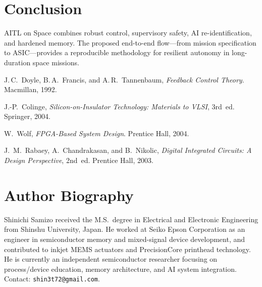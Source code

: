 \documentclass[conference]{IEEEtran}
\begin{document}
\section{Conclusion}
AITL on Space combines robust control, supervisory safety, AI re-identification, and hardened memory. The proposed end-to-end flow—from mission specification to ASIC—provides a reproducible methodology for resilient autonomy in long-duration space missions.

\begin{thebibliography}{99}
J.\,C.~Doyle, B.\,A.~Francis, and A.\,R.~Tannenbaum,
\emph{Feedback Control Theory}. Macmillan, 1992.

J.-P.~Colinge, \emph{Silicon-on-Insulator Technology: Materials to VLSI}, 3rd~ed. Springer, 2004.

W.~Wolf, \emph{FPGA-Based System Design}. Prentice Hall, 2004.

J.~M.~Rabaey, A.~Chandrakasan, and B.~Nikolic,
\emph{Digital Integrated Circuits: A Design Perspective}, 2nd~ed. Prentice Hall, 2003.
\end{thebibliography}

\section*{Author Biography}
Shinichi Samizo received the M.S.\ degree in Electrical and Electronic Engineering from Shinshu University, Japan. He worked at Seiko Epson Corporation as an engineer in semiconductor memory and mixed-signal device development, and contributed to inkjet MEMS actuators and PrecisionCore printhead technology. He is currently an independent semiconductor researcher focusing on process/device education, memory architecture, and AI system integration. Contact: \texttt{shin3t72@gmail.com}.
\end{document}
